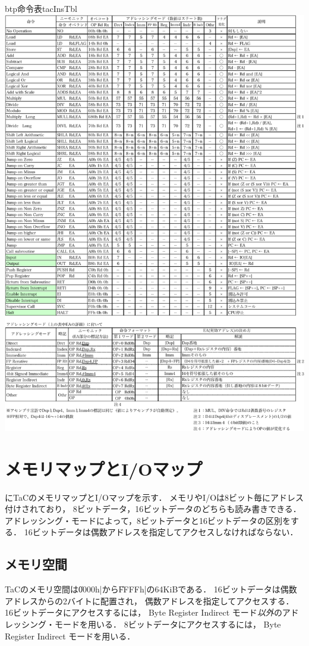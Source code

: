 \begin{myfig}{btp}{命令表}{tacInsTbl}
  \includegraphics[scale=0.94]{Tbl/TaC7a-instruction-p2-crop.pdf}
\end{myfig}

\newpage
\section{メモリマップとI/Oマップ}
にTaCのメモリマップとI/Oマップを示す．
メモリやI/Oは8ビット毎にアドレス付けされており，
8ビットデータ，16ビットデータのどちらも読み書きできる．
アドレッシング・モードによって，8ビットデータと16ビットデータの区別をする．
16ビットデータは偶数アドレスを指定してアクセスしなければならない．

\subsection{メモリ空間}
TaCのメモリ空間は\|0000h|から\|FFFFh|の64KiBである．
16ビットデータは偶数アドレスからの2バイトに配置され，
偶数アドレスを指定してアクセスする．
16ビットデータにアクセスするには，
Byte Register Indirect モード\emph{以外}のアドレッシング・モードを用いる．
8ビットデータにアクセスするには，
Byte Register Indirect モードを用いる．

